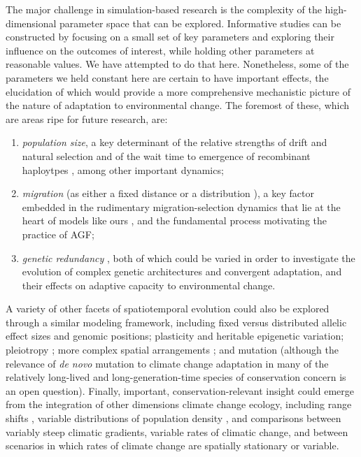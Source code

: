 \documentclass[9pt,twocolumn,twoside,lineno]{pnas-new}
\begin{document}
The major challenge in simulation-based research is the complexity of the high-dimensional 
parameter space that can be explored. Informative studies can be constructed by focusing on a 
small set of key parameters and exploring their influence
on the outcomes of interest, while holding other parameters at reasonable values. We have 
attempted to do that here. Nonetheless, some of the parameters we held constant here are certain 
to have important effects, the elucidation of which would provide a more comprehensive 
mechanistic picture of the nature of adaptation to environmental change. The foremost of these, 
which are areas ripe for future research, are:
    \begin{enumerate}
        \item \textit{population size}, a key determinant of the relative strengths of drift and natural selection \cite{murray} and of the wait time to emergence of recombinant haploytpes \cite{christiansen}, among other important dynamics;
        \item \textit{migration} (as either a fixed distance or a distribution \cite{paulose}), a key factor embedded in the rudimentary migration-selection dynamics that lie at the heart of models like ours \cite{wright,haldane,barton}, and the fundamental process motivating the practice of AGF;
        \item \textit{genetic redundancy} \cite{barghi_redundancy,barghi_polygenic,laruson} , both of which could be varied in order to investigate the evolution of complex genetic architectures and convergent adaptation, and their effects on adaptive capacity to environmental change.
    \end{enumerate}
    A variety of other facets of spatiotemporal evolution could also be explored through a similar modeling framework, including fixed versus distributed allelic effect sizes \cite{orr} and genomic positions; plasticity \cite{chevin} and heritable epigenetic variation; pleiotropy \cite{thompson}; more complex spatial arrangements \cite{benes}; and mutation (although the relevance of \textit{de novo} mutation to climate change adaptation in many of the relatively long-lived and long-generation-time species of conservation concern is an open question).
    Finally, important, conservation-relevant insight could emerge from the integration of other dimensions climate change ecology, including range shifts \cite{weiss-lehman}, variable distributions of population density \cite{aitken_whitlock}, and comparisons between variably steep climatic gradients, variable rates of climatic change, and between scenarios in which rates of climate change are spatially stationary or variable. 
\end{document}
